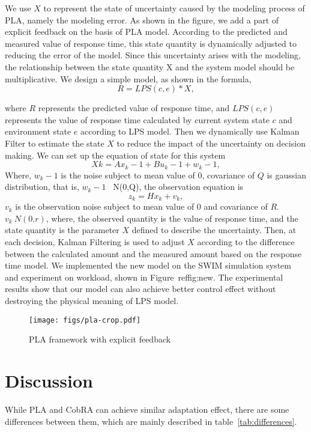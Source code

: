 \documentclass[sigconf]{acmart}
\begin{document}
	We use $X$ to represent the state of uncertainty caused by the modeling process of PLA, namely the modeling error. As shown in the figure, we add a part of explicit feedback on the basis of PLA model. According to the predicted and measured value of response time, this state quantity is dynamically adjusted to reducing the error of the model.
	Since this uncertainty arises with the modeling, the relationship between the state quantity X and the system model should be multiplicative. We design a simple model, as shown in the formula,
	\begin{equation}
	R=LPS(c,e)*X,
	\end{equation}
	
	where $R$ represents the predicted value of response time, and $LPS(c,e)$ represents the value of response time calculated by current system state $c$ and environment state $e$ according to LPS model. Then we dynamically use Kalman Filter to estimate the state $X$ to reduce the impact of the uncertainty on decision making.
	We can set up the equation of state for this system
	\begin{equation}
	Xk=Ax_k-1+Bu_k-1+w_k-1,
	\end{equation}
	Where, $w_k-1$ is the noise subject to mean value of 0, covariance of $Q$ is gaussian distribution, that is, $w_k-1$ ~N(0,Q), the observation equation is 
	\begin{equation}
	z_k =Hx_k+v_k,
	\end{equation}
	$v_k$ is the observation noise subject to mean value of 0 and covariance of $R$. $v_k~N(0.r)$, where, the observed quantity is the value of response time, and the state quantity is the parameter $X$ defined to describe the uncertainty. Then, at each decision, Kalman Filtering is used to adjust $X$ according to the difference between the calculated amount and the measured amount based on the response time model.
	We implemented the new model on the SWIM simulation system and experiment on workload, shown in Figure~ref{fig:new}.
	The experimental results show that our model can also achieve better control effect without destroying the physical meaning of LPS model.
	\begin{figure}[!htp]
		\centering	
		\texttt{[image: figs/pla-crop.pdf]}
		\label{fig:new}
		\caption{PLA framework with explicit feedback}
	\end{figure}
	
	
	\section{Discussion}
	While PLA and CobRA can achieve similar adaptation effect, there are some differences between them, which are mainly described in table~\ref{tab:differences}. 
	
\end{document}
